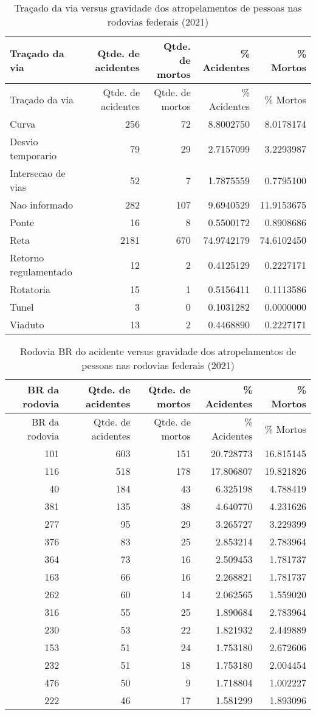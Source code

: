 \documentclass[
]{article}
\begin{document}
\begin{longtable}[]{@{}lrrrr@{}}
\caption{Traçado da via versus gravidade dos atropelamentos de pessoas
nas rodovias federais (2021)}\tabularnewline
\toprule
Traçado da via & Qtde. de acidentes & Qtde. de mortos & \% Acidentes &
\% Mortos \\
\midrule
\endfirsthead
\toprule
Traçado da via & Qtde. de acidentes & Qtde. de mortos & \% Acidentes &
\% Mortos \\
\midrule
\endhead
Curva & 256 & 72 & 8.8002750 & 8.0178174 \\
Desvio temporario & 79 & 29 & 2.7157099 & 3.2293987 \\
Intersecao de vias & 52 & 7 & 1.7875559 & 0.7795100 \\
Nao informado & 282 & 107 & 9.6940529 & 11.9153675 \\
Ponte & 16 & 8 & 0.5500172 & 0.8908686 \\
Reta & 2181 & 670 & 74.9742179 & 74.6102450 \\
Retorno regulamentado & 12 & 2 & 0.4125129 & 0.2227171 \\
Rotatoria & 15 & 1 & 0.5156411 & 0.1113586 \\
Tunel & 3 & 0 & 0.1031282 & 0.0000000 \\
Viaduto & 13 & 2 & 0.4468890 & 0.2227171 \\
\bottomrule
\end{longtable}

\begin{longtable}[]{@{}rrrrr@{}}
\caption{Rodovia BR do acidente versus gravidade dos atropelamentos de
pessoas nas rodovias federais (2021)}\tabularnewline
\toprule
BR da rodovia & Qtde. de acidentes & Qtde. de mortos & \% Acidentes & \%
Mortos \\
\midrule
\endfirsthead
\toprule
BR da rodovia & Qtde. de acidentes & Qtde. de mortos & \% Acidentes & \%
Mortos \\
\midrule
\endhead
101 & 603 & 151 & 20.728773 & 16.815145 \\
116 & 518 & 178 & 17.806807 & 19.821826 \\
40 & 184 & 43 & 6.325198 & 4.788419 \\
381 & 135 & 38 & 4.640770 & 4.231626 \\
277 & 95 & 29 & 3.265727 & 3.229399 \\
376 & 83 & 25 & 2.853214 & 2.783964 \\
364 & 73 & 16 & 2.509453 & 1.781737 \\
163 & 66 & 16 & 2.268821 & 1.781737 \\
262 & 60 & 14 & 2.062565 & 1.559020 \\
316 & 55 & 25 & 1.890684 & 2.783964 \\
230 & 53 & 22 & 1.821932 & 2.449889 \\
153 & 51 & 24 & 1.753180 & 2.672606 \\
232 & 51 & 18 & 1.753180 & 2.004454 \\
476 & 50 & 9 & 1.718804 & 1.002227 \\
222 & 46 & 17 & 1.581299 & 1.893096 \\
\bottomrule
\end{longtable}
\end{document}
